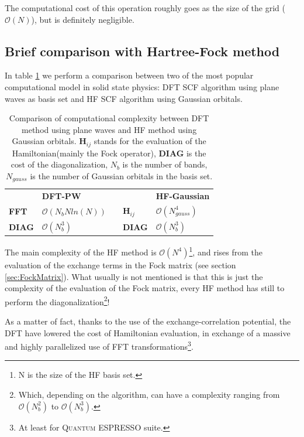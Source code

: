 \documentclass[a4paper,12pt]{article}
\newcommand\mf[1]{\mathbf{#1}}
\newcommand\QE{\textsc{Quantum} ESPRESSO }
\newcommand\bigO{\mathcal{O}}
\begin{document}
The computational cost of this operation roughly goes as the size of the grid ($\bigO(N)$), but is definitely negligible.


\subsection{Brief comparison with Hartree-Fock method}
In table \ref{tab:HF-DFTComp} we perform a comparison between two of the most popular computational model in solid state physics: DFT SCF algorithm using plane waves as basis set and HF SCF algorithm using Gaussian orbitals.


\begin{table}[h]
\centering
\begin{tabular}{l|l|ll|l|}
\cline{2-2} \cline{5-5}
                                    & \textbf{DFT-PW}        &                       &                    & \textbf{HF-Gaussian} \\ \cline{1-2} \cline{4-5} 
\multicolumn{1}{|l|}{\textbf{FFT}}  & $\bigO(N_{b}N ln(N) )$ & \multicolumn{1}{l|}{} & $\mf{H}_{ij}$ & $\bigO(N_{gauss}^4)$ \\ \cline{1-2} \cline{4-5} 
\multicolumn{1}{|l|}{\textbf{DIAG}} & $\bigO(N_{b}^3)$       & \multicolumn{1}{l|}{} & \textbf{DIAG}      & $\bigO(N_{b}^3)$     \\ \cline{1-2} \cline{4-5} 
\end{tabular}
\caption{Comparison of computational complexity between DFT method using plane waves and HF method using Gaussian orbitals. $\mf{H}_{ij}$ stands for the evaluation of the Hamiltonian(mainly the Fock operator), \textbf{DIAG} is the cost of the diagonalization, $N_b$ is the number of bands, $N_{gauss}$ is the number of Gaussian orbitals in the basis set.}
\label{tab:HF-DFTComp}
\end{table}

The main complexity of the HF method is $\bigO(N^4)$\footnote{N is the size of the HF basis set.}, and rises from the evaluation of the exchange terms in the Fock matrix (see section \ref{sec:FockMatrix}). 
What usually is not mentioned is that this is just the complexity of the evaluation of the Fock matrix, every HF method has still to perform the diagonalization\footnote{Which, depending on the algorithm, can have a complexity ranging from $\bigO(N_{b}^2)$ to $\bigO(N_{b}^3)$.}!

As a matter of fact, thanks to the use of the exchange-correlation potential, the DFT have lowered the cost of Hamiltonian evaluation, in exchange of a massive and highly parallelized use of FFT transformations\footnote{At least for \QE suite.}.
\end{document}
